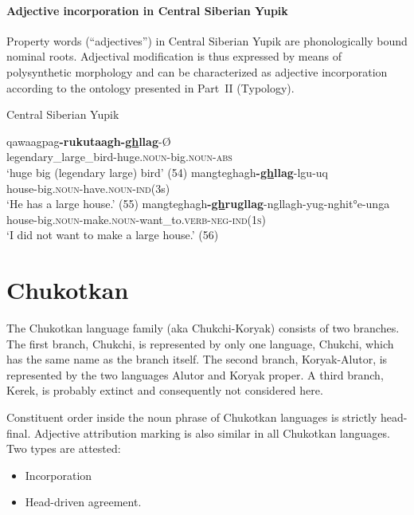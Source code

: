 \paragraph*{Adjective incorporation in Central Siberian Yupik}
Property words (“adjectives”) in Central Siberian Yupik are phonologically bound nominal roots. Adjectival modification is thus expressed by means of polysynthetic morphology and can be characterized as adjective incorporation according to the ontology presented in Part~II (Typology).
\begin{exe}
\ex \rm{Central Siberian Yupik \citep{de-reuse1994}}
\begin{xlist}
\ex
\gll	qawaagpag\textbf{-rukutaagh-\underline{gh}llag}-Ø\\
	legendary\_large\_bird-huge.\textsc{noun}-big.\textsc{noun}-\textsc{abs}\\
\glt	‘huge big (legendary large) bird’ (54)
\ex	
\gll	mangteghagh\textbf{-\underline{gh}llag}-lgu-uq\\
	house-big.\textsc{noun}-have.\textsc{noun}-\textsc{ind}(3s)\\
\glt	‘He has a large house.’ (55)
\ex	
\gll	mangteghagh\textbf{-\underline{gh}rugllag}-ngllagh-yug-nghit°e-unga\\
	house-big.\textsc{noun}-make.\textsc{noun}-want\_to.\textsc{verb}-\textsc{neg}-\textsc{ind(1s)}\\
\glt	‘I did not want to make a large house.’ (56)
\end{xlist}
\end{exe}

\section{Chukotkan}
The Chukotkan language family (aka Chukchi-Koryak) consists of two branches. The first branch, Chukchi, is represented by only one language, Chukchi, which has the same name as the branch itself. The second branch, Koryak-Alutor, is represented by the two languages Alutor and Koryak proper. A third branch, Kerek, is probably extinct \cite[253]{salminen2007} and consequently not considered here.

Constituent order inside the noun phrase of Chukotkan languages is strictly head-final. Adjective attribution marking is also similar in all Chukotkan languages. Two types are attested:
\begin{itemize}
\item Incorporation
\item Head\hyp{}driven agreement.
\end{itemize}

